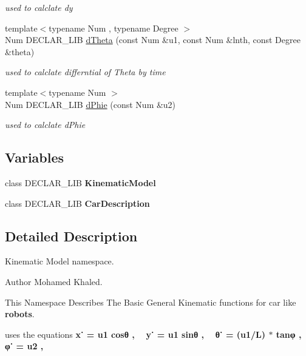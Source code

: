 \begin{DoxyCompactItemize}
\begin{DoxyCompactList}\small\item\em used to calclate dy \end{DoxyCompactList}\item 
{\footnotesize template$<$typename Num , typename Degree $>$ }\\Num D\+E\+C\+L\+A\+R\+\_\+\+L\+IB \hyperlink{namespace_path_1_1_kinematic_models_ae5c91053b1ebb8437864fcd208a45d27}{d\+Theta} (const Num \&u1, const Num \&lnth, const Degree \&theta)
\begin{DoxyCompactList}\small\item\em used to calclate differntial of Theta by time \end{DoxyCompactList}\item 
{\footnotesize template$<$typename Num $>$ }\\Num D\+E\+C\+L\+A\+R\+\_\+\+L\+IB \hyperlink{namespace_path_1_1_kinematic_models_a9056e401aa320699847d4ab3b3e73a98}{d\+Phie} (const Num \&u2)
\begin{DoxyCompactList}\small\item\em used to calclate d\+Phie \end{DoxyCompactList}\end{DoxyCompactItemize}
\subsection*{Variables}
\begin{DoxyCompactItemize}
\item 
\mbox{\label{namespace_path_1_1_kinematic_models_a3c42bccfe7cadc3cdc95b21d247ba71d}} 
class D\+E\+C\+L\+A\+R\+\_\+\+L\+IB {\bfseries Kinematic\+Model}
\item 
\mbox{\label{namespace_path_1_1_kinematic_models_a963c2abaa9c22129daad361ab3c4183e}} 
class D\+E\+C\+L\+A\+R\+\_\+\+L\+IB {\bfseries Car\+Description}
\end{DoxyCompactItemize}


\subsection{Detailed Description}
Kinematic Model namespace. 

\begin{DoxyAuthor}{Author}
Mohamed Khaled.
\end{DoxyAuthor}
This Namespace Describes The Basic General Kinematic functions for car like {\bfseries robots}.  \begin{DoxyParagraph}{uses the equations}
{\bfseries  x˙ = u1 cosθ , ~\newline
 y˙ = u1 sinθ , ~\newline
 θ˙ = (u1/L) $\ast$ tanφ , ~\newline
 φ˙ = u2 , ~\newline
 } 
\end{DoxyParagraph}


